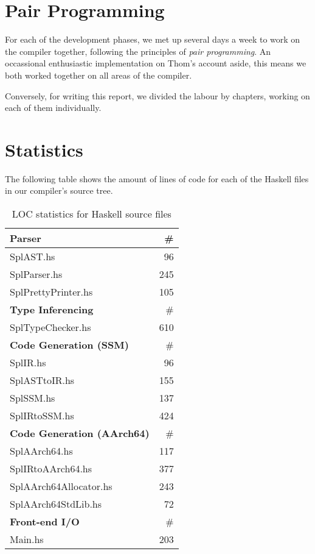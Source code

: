 \section{Pair Programming}

For each of the development phases, we met up several days a week to work on the compiler together, following the principles of \emph{pair programming}.
An occassional enthusiastic implementation on Thom's account aside, this means we both worked together on all areas of the compiler.

Conversely, for writing this report, we divided the labour by chapters, working on each of them individually.


\section{Statistics}

The following table shows the amount of lines of code for each of the Haskell files in our compiler's source tree.

\begin{table}[ht!]
	\centering
	\begin{tabular}{|l|r|}
		\hline
		\textbf{Parser} 	& \# \\
		\hline
		SplAST.hs 			& 96 \\
		SplParser.hs 		& 245 \\
		SplPrettyPrinter.hs & 105 \\

		\hline
		\textbf{Type Inferencing} & \# \\
		\hline
		SplTypeChecker.hs 	& 610 \\

		\hline
		\textbf{Code Generation (SSM)} & \# \\
		\hline
		SplIR.hs 			& 96 \\
		SplASTtoIR.hs 		& 155 \\
		SplSSM.hs 			& 137 \\
		SplIRtoSSM.hs 		& 424 \\

		\hline
		\textbf{Code Generation (AArch64)} & \# \\
		\hline
		SplAArch64.hs 		& 117 \\
		SplIRtoAArch64.hs 	& 377 \\
		SplAArch64Allocator.hs & 243 \\
		SplAArch64StdLib.hs & 72 \\

		\hline
		\textbf{Front-end I/O} & \# \\
		\hline
		Main.hs 			& 203 \\
		\hline
	\end{tabular}
	\caption{LOC statistics for Haskell source files}
\end{table}
